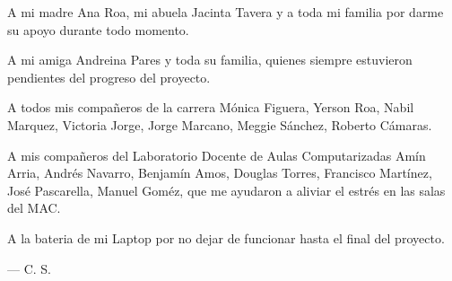 \documentclass[letterpaper, 12pt, twoside, spanish]{tesis}
\newcommand{\thechaptername}{\relax}
\newcommand{\setchapter}[1]{\renewcommand{\thechaptername}{#1}}
\begin{document}
{{\begin{multicols}{2}
\vfill
\columnbreak

A mi madre Ana Roa, mi abuela Jacinta Tavera y a toda mi familia por darme su
apoyo durante todo momento.

A mi amiga Andreina Pares y toda su familia, quienes siempre estuvieron
pendientes del progreso del proyecto.

A todos mis compañeros de la carrera Mónica Figuera, Yerson Roa, Nabil
Marquez, Victoria Jorge, Jorge Marcano, Meggie Sánchez, Roberto Cámaras.

A mis compañeros del Laboratorio Docente de Aulas Computarizadas Amín Arria,
Andrés Navarro, Benjamín Amos, Douglas Torres, Francisco Martínez, José
Pascarella, Manuel Goméz, que me ayudaron a aliviar el estrés en las salas del
MAC.

A la bateria de mi Laptop por no dejar de funcionar hasta el final del
proyecto.

\begin{flushright}
\vspace{-5mm}
  --- C. S.
\end{flushright}
\end{multicols}
}}
\cleardoublepage

\pagestyle{fancy}

\setchapter{\emph{Índice general}}
\tableofcontents

%

\setchapter{\emph{Índice de Fragmentos de Código}}
\renewcommand{\lstlistlistingname}{Índice de Fragmentos de Código}
\lstlistoflistings


\clearpage
%
\end{document}
